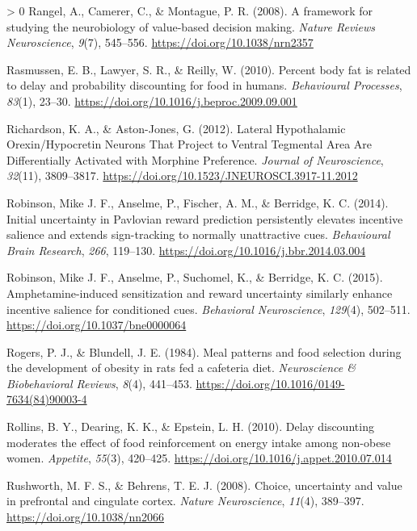 \documentclass[
]{/home/nicoluarte/Downloads/templates/PNAS-template-main.tex}
\newlength{\cslhangindent}
\newenvironment{CSLReferences}[3] %
 {%
  \setlength{\parindent}{0pt}
  \ifodd #1 \everypar{\setlength{\hangindent}{\cslhangindent}}\ignorespaces\fi
  \ifnum #2 > 0
  \setlength{\parskip}{#2\baselineskip}
  \fi
 }%
 {}
\begin{document}
\begin{CSLReferences}{1}{0}
\leavevmode\hypertarget{ref-KPZRMRFZ}{}%
Rangel, A., Camerer, C., \& Montague, P. R. (2008). A framework for
studying the neurobiology of value-based decision making. \emph{Nature
Reviews Neuroscience}, \emph{9}(7), 545--556.
\url{https://doi.org/10.1038/nrn2357}

\leavevmode\hypertarget{ref-7B4XUYMB}{}%
Rasmussen, E. B., Lawyer, S. R., \& Reilly, W. (2010). Percent body fat
is related to delay and probability discounting for food in humans.
\emph{Behavioural Processes}, \emph{83}(1), 23--30.
\url{https://doi.org/10.1016/j.beproc.2009.09.001}

\leavevmode\hypertarget{ref-KN9TLADJ}{}%
Richardson, K. A., \& Aston-Jones, G. (2012). Lateral Hypothalamic
Orexin/Hypocretin Neurons That Project to Ventral Tegmental Area Are
Differentially Activated with Morphine Preference. \emph{Journal of
Neuroscience}, \emph{32}(11), 3809--3817.
\url{https://doi.org/10.1523/JNEUROSCI.3917-11.2012}

\leavevmode\hypertarget{ref-2YZE6SVW}{}%
Robinson, Mike J. F., Anselme, P., Fischer, A. M., \& Berridge, K. C.
(2014). Initial uncertainty in Pavlovian reward prediction persistently
elevates incentive salience and extends sign-tracking to normally
unattractive cues. \emph{Behavioural Brain Research}, \emph{266},
119--130. \url{https://doi.org/10.1016/j.bbr.2014.03.004}

\leavevmode\hypertarget{ref-UZET5L4Z}{}%
Robinson, Mike J. F., Anselme, P., Suchomel, K., \& Berridge, K. C.
(2015). Amphetamine-induced sensitization and reward uncertainty
similarly enhance incentive salience for conditioned cues.
\emph{Behavioral Neuroscience}, \emph{129}(4), 502--511.
\url{https://doi.org/10.1037/bne0000064}

\leavevmode\hypertarget{ref-CAGXZWY4}{}%
Rogers, P. J., \& Blundell, J. E. (1984). Meal patterns and food
selection during the development of obesity in rats fed a cafeteria
diet. \emph{Neuroscience \& Biobehavioral Reviews}, \emph{8}(4),
441--453. \url{https://doi.org/10.1016/0149-7634(84)90003-4}

\leavevmode\hypertarget{ref-GHWUZPNL}{}%
Rollins, B. Y., Dearing, K. K., \& Epstein, L. H. (2010). Delay
discounting moderates the effect of food reinforcement on energy intake
among non-obese women. \emph{Appetite}, \emph{55}(3), 420--425.
\url{https://doi.org/10.1016/j.appet.2010.07.014}

\leavevmode\hypertarget{ref-HVH8KZZ2}{}%
Rushworth, M. F. S., \& Behrens, T. E. J. (2008). Choice, uncertainty
and value in prefrontal and cingulate cortex. \emph{Nature
Neuroscience}, \emph{11}(4), 389--397.
\url{https://doi.org/10.1038/nn2066}


\end{CSLReferences}
\end{document}
